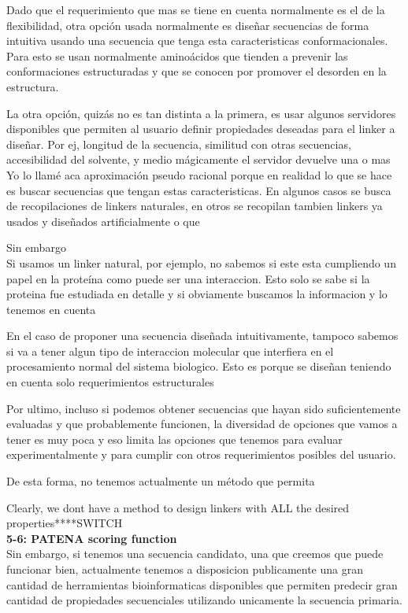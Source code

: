 \documentclass[a4paper,10pt]{article}
\begin{document}
Dado que el requerimiento que mas se tiene en cuenta normalmente es el de la flexibilidad, 
otra opción usada normalmente es diseñar secuencias de forma intuitiva usando una secuencia que tenga esta caracteristicas conformacionales. 
Para esto se usan normalmente aminoácidos que tienden a prevenir las conformaciones estructuradas y que se conocen por promover el desorden en la estructura.

La otra opción, quizás no es tan distinta a la primera, es usar algunos servidores disponibles que permiten al usuario definir propiedades deseadas para el linker a diseñar.
Por ej, longitud de la secuencia, similitud con otras secuencias, accesibilidad del solvente, y medio mágicamente el servidor devuelve una o mas 
Yo lo llamé aca aproximación pseudo racional porque en realidad lo que se hace es buscar secuencias que tengan estas caracteristicas.
En algunos casos se busca de recopilaciones de linkers naturales, en otros se recopilan tambien linkers ya usados y diseñados artificialmente o que 


Sin embargo\\
Si usamos un linker natural, por ejemplo, no sabemos si este esta cumpliendo un papel en la proteína como puede ser una interaccion.
Esto solo se sabe si la proteina fue estudiada en detalle y si obviamente buscamos la informacion y lo tenemos en cuenta

En el caso de proponer una secuencia diseñada intuitivamente, tampoco sabemos si va a tener algun tipo de interaccion molecular que interfiera en el procesamiento normal del sistema biologico.
Esto es porque se diseñan teniendo en cuenta solo requerimientos estructurales

Por ultimo, incluso si podemos obtener secuencias que hayan sido suficientemente evaluadas y que probablemente funcionen, la diversidad de opciones que vamos a tener es muy poca y eso limita 
las opciones que tenemos para evaluar experimentalmente y para cumplir con otros requerimientos posibles del usuario.

De esta forma, no tenemos actualmente un método que permita 

Clearly, we dont have a method to design linkers with ALL the desired properties****SWITCH\\



\textbf{5-6: PATENA scoring function}\\
Sin embargo, si tenemos una secuencia candidato, una que creemos que puede funcionar bien, actualmente tenemos a disposicion publicamente una gran cantidad de herramientas bioinformaticas disponibles que permiten predecir
gran cantidad de propiedades secuenciales utilizando unicamente la secuencia primaria.
\end{document}
